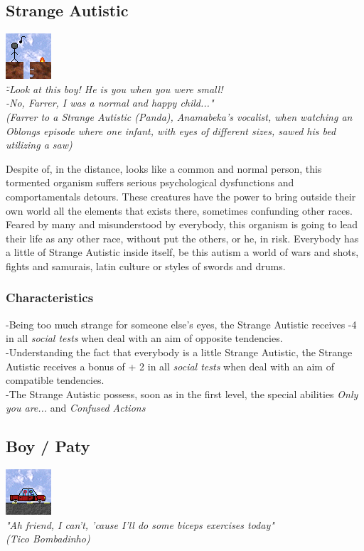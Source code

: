 \documentclass[ letterpaper,12pt]{article}
\begin{document}
\subsection{Strange Autistic}
\includegraphics{../data/races/Img/autista.png}\\
{\it \" -Look at this boy! He is you when you were small!\\
 -No, Farrer, I was a normal and happy child..."\\
(Farrer to a Strange Autistic (Panda), Anamabeka's vocalist, when watching an Oblongs episode where one infant, with eyes of different sizes, sawed his bed utilizing a saw)\\}

Despite of, in the distance, looks like a common and normal person, this
tormented organism suffers serious psychological dysfunctions and
comportamentals detours. These creatures have the power to bring outside their
own world all the elements that exists there, sometimes confunding other races.
Feared by many and misunderstood by everybody, this organism is going to lead
their life as any other race, without put the others, or he, in risk.
Everybody has a little of Strange Autistic inside itself, be this autism a
world of wars and shots, fights and samurais, latin culture or styles of swords
and drums.

\subsubsection{Characteristics}
-Being too much strange for someone else's eyes, the Strange Autistic receives -4 in all {\it social tests} when deal with an aim of opposite tendencies. \\
-Understanding the fact that everybody is a little Strange Autistic, the Strange Autistic receives a bonus of + 2 in all {\it social tests} when deal with an aim of compatible tendencies.\\
-The Strange Autistic possess, soon as in the first level, the special abilities {\it Only you are...} and {\it Confused Actions}\\

\subsection{Boy / Paty}
\includegraphics{../data/races/Img/boy.png}\\
{\it "Ah friend, I can't, 'cause I'll do some biceps exercises today"\\
(Tico Bombadinho)\\}
\end{document}
